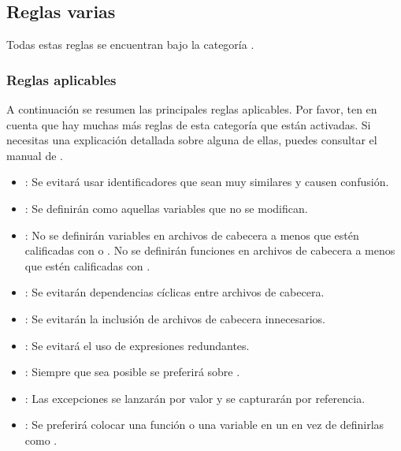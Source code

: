 \subsection{Reglas varias}

Todas estas reglas se encuentran bajo la categoría .

\subsubsection{Reglas aplicables}

A continuación se resumen las principales reglas aplicables. Por favor, ten en cuenta que hay muchas más
reglas de esta categoría que están activadas. Si necesitas una explicación detallada sobre alguna de ellas,
puedes consultar el manual de .

\begin{itemize}

\item {}:
Se evitará usar identificadores que sean muy similares y causen confusión.

\item {}:
Se definirán como  aquellas variables que no se modifican.

\item {}:
No se definirán variables en archivos de cabecera a menos que estén calificadas
con  o .
No se definirán funciones en archivos de cabecera a menos que estén calificadas
con .

\item {}:
Se evitarán dependencias cíclicas entre archivos de cabecera.

\item {}:
Se evitarán la inclusión de archivos de cabecera innecesarios.

\item {}:
Se evitará el uso de expresiones redundantes.

\item {}:
Siempre que sea posible se preferirá  sobre .

\item {}:
Las excepciones se lanzarán por valor y se capturarán por referencia.

\item {}:
Se preferirá colocar una función o una variable en un  en vez de definirlas como .

\end{itemize}

